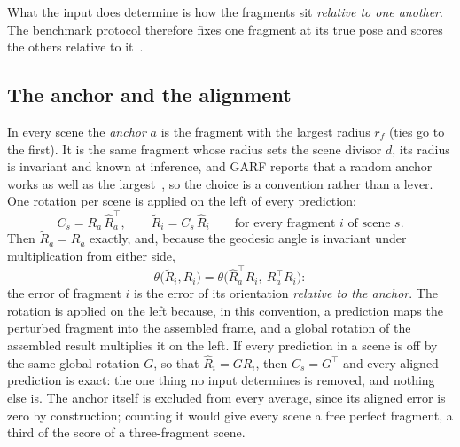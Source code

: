 \documentclass[11pt,a4paper]{article}
\theoremstyle{remark}
\newcommand{\T}{^{\top}}
\begin{document}
What the input does determine is how the fragments sit \emph{relative to one another}. The benchmark protocol therefore fixes one fragment at its true pose and scores the others relative to it~\cite{li2025garf,wang2025puzzlefusionpp}.

\subsection{The anchor and the alignment}
In every scene the \emph{anchor} $a$ is the fragment with the largest radius $r_f$ (ties go to the first). It is the same fragment whose radius sets the scene divisor $d$, its radius is invariant and known at inference, and GARF reports that a random anchor works as well as the largest~\cite{li2025garf}, so the choice is a convention rather than a lever. One rotation per scene is applied on the left of every prediction:
\begin{equation}
  C_s=R_a\,\hat R_a\T,\qquad \tilde R_i=C_s\,\hat R_i\qquad\text{for every fragment $i$ of scene $s$.}
  \label{eq:anchor}
\end{equation}
Then $\tilde R_a=R_a$ exactly, and, because the geodesic angle is invariant under multiplication from either side,
\begin{equation}
  \theta\big(\tilde R_i,R_i\big)=\theta\big(\hat R_a\T\hat R_i,\ R_a\T R_i\big):
  \label{eq:relative}
\end{equation}
the error of fragment $i$ is the error of its orientation \emph{relative to the anchor}. The rotation is applied on the left because, in this convention, a prediction maps the perturbed fragment into the assembled frame, and a global rotation of the assembled result multiplies it on the left. If every prediction in a scene is off by the same global rotation $G$, so that $\hat R_i=GR_i$, then $C_s=G\T$ and every aligned prediction is exact: the one thing no input determines is removed, and nothing else is. The anchor itself is excluded from every average, since its aligned error is zero by construction; counting it would give every scene a free perfect fragment, a third of the score of a three-fragment scene.
\end{document}
